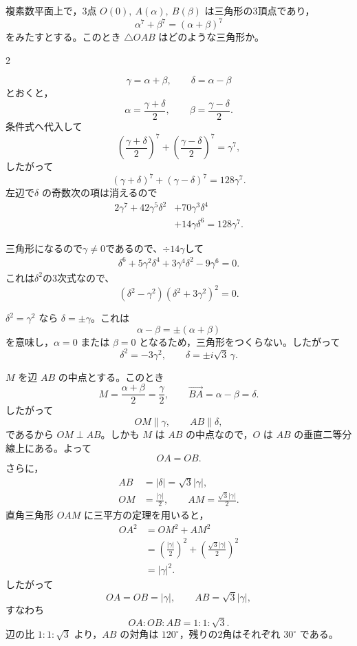 \documentclass[a4paper,9pt]{extarticle}
\newcommand{\vect}[1]{\overrightarrow{#1}}
\newcommand{\stephead}[1]{\vspace{1.5pt}{\sffamily\bfseries #1}\par}
\begin{document}
\begin{problembox}
複素数平面上で，3点 $O(0),\ A(\alpha),\ B(\beta)$ は三角形の3頂点であり，
\[
  \alpha^7+\beta^7=(\alpha+\beta)^7
\]
をみたすとする。このとき $\triangle OAB$ はどのような三角形か。
\end{problembox}

\begin{multicols}{2}

\[
 \gamma=\alpha+\beta,\qquad \delta=\alpha-\beta
\]
とおくと，
\[
 \alpha=\frac{\gamma+\delta}{2},\qquad
 \beta=\frac{\gamma-\delta}{2}.
\]
条件式へ代入して
\[
 \left(\frac{\gamma+\delta}{2}\right)^7+
 \left(\frac{\gamma-\delta}{2}\right)^7=\gamma^7,
\]
したがって
\[
 (\gamma+\delta)^7+(\gamma-\delta)^7=128\gamma^7.
\]
左辺で$\delta$ の奇数次の項は消えるので
\[
\begin{aligned}
 2\gamma^7+42\gamma^5\delta^2
 &+70\gamma^3\delta^4\\
 &+14\gamma\delta^6=128\gamma^7.
\end{aligned}
\]

三角形になるので$\gamma\neq0$であるので、$\div14\gamma$して
\[
\begin{aligned}
\delta^6+5\gamma^2\delta^4+3\gamma^4\delta^2-9\gamma^6=0.
\end{aligned}
\]
これは$\delta^2$の3次式なので、
\[
 \boxed{(\delta^2-\gamma^2)(\delta^2+3\gamma^2)^2=0}.
\]

\stephead{2．退化する解を除く}
$\delta^2=\gamma^2$ なら $\delta=\pm\gamma$。これは
\[
 \alpha-\beta=\pm(\alpha+\beta)
\]
を意味し，$\alpha=0$ または $\beta=0$ となるため，三角形をつくらない。したがって
\[
 \delta^2=-3\gamma^2,
 \qquad
 \boxed{\delta=\pm i\sqrt3\,\gamma}.
\]

\columnbreak


$M$ を辺 $AB$ の中点とする。このとき
\[
 M=\frac{\alpha+\beta}{2}=\frac{\gamma}{2},
 \qquad
 \vect{BA}=\alpha-\beta=\delta.
\]
したがって
\[
 OM\parallel\gamma,
 \qquad AB\parallel\delta,
\]
であるから $OM\perp AB$。しかも $M$ は $AB$ の中点なので，$O$ は $AB$ の垂直二等分線上にある。よって
\[
 OA=OB.
\]
さらに，
\[
\begin{aligned}
 AB&=|\delta|=\sqrt3|\gamma|,\\
 OM&=\frac{|\gamma|}{2},\qquad
 AM=\frac{\sqrt3|\gamma|}{2}.
\end{aligned}
\]
直角三角形 $OAM$ に三平方の定理を用いると，
\[
\begin{aligned}
 OA^2&=OM^2+AM^2\\
 &=\left(\frac{|\gamma|}{2}\right)^2
  +\left(\frac{\sqrt3|\gamma|}{2}\right)^2\\
 &=|\gamma|^2.
\end{aligned}
\]
したがって
\[
 OA=OB=|\gamma|,
 \qquad AB=\sqrt3|\gamma|,
\]
すなわち
\[
 \boxed{OA:OB:AB=1:1:\sqrt3}.
\]
辺の比 $1:1:\sqrt3$ より，$AB$ の対角は $120^\circ$，残りの2角はそれぞれ $30^\circ$ である。

\end{multicols}
\end{document}
